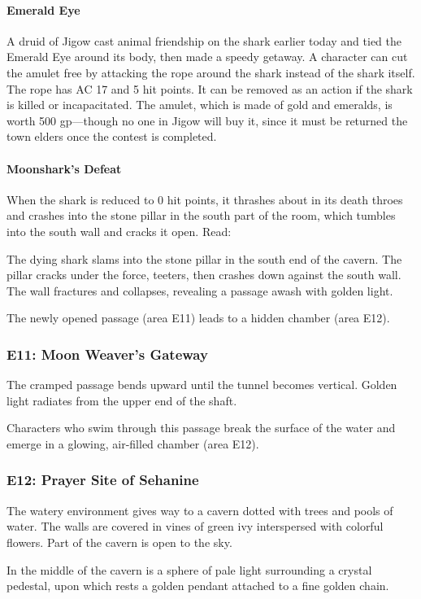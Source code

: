 \documentclass[10pt,a4paper,twoside,bg=print,twocolumn,openany,nodeprecatedcode]{dndbook}
\begin{document}
\paragraph{Emerald Eye}
A druid of Jigow cast animal friendship on the shark earlier today and tied the Emerald Eye around its body, then made a speedy getaway. A character can cut the amulet free by attacking the rope around the shark instead of the shark itself. The rope has AC 17 and 5 hit points. It can be removed as an action if the shark is killed or incapacitated. The amulet, which is made of gold and emeralds, is worth 500 gp—though no one in Jigow will buy it, since it must be returned the town elders once the contest is completed.

\paragraph{Moonshark's Defeat}
When the shark is reduced to 0 hit points, it thrashes about in its death throes and crashes into the stone pillar in the south part of the room, which tumbles into the south wall and cracks it open. Read:

\begin{DndReadAloud}{}
The dying shark slams into the stone pillar in the south end of the cavern. The pillar cracks under the force, teeters, then crashes down against the south wall. The wall fractures and collapses, revealing a passage awash with golden light.

\end{DndReadAloud}

The newly opened passage (area E11) leads to a hidden chamber (area E12).

\subsubsection{E11: Moon Weaver's Gateway}
\begin{DndReadAloud}{}
The cramped passage bends upward until the tunnel becomes vertical. Golden light radiates from the upper end of the shaft.

\end{DndReadAloud}

Characters who swim through this passage break the surface of the water and emerge in a glowing, air-filled chamber (area E12).


  
\subsubsection{E12: Prayer Site of Sehanine}
\begin{DndReadAloud}{}
The watery environment gives way to a cavern dotted with trees and pools of water. The walls are covered in vines of green ivy interspersed with colorful flowers. Part of the cavern is open to the sky.

In the middle of the cavern is a sphere of pale light surrounding a crystal pedestal, upon which rests a golden pendant attached to a fine golden chain.

\end{DndReadAloud}
\end{document}
